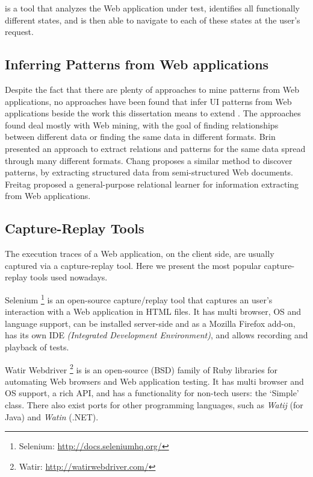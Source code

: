 \cite{dallmeier2012Webmate,dallmeier2013Webmate} is a tool that analyzes the Web application under test, identifies all functionally different states, and is then able to navigate to each of these states at the user’s request.

\subsection{Inferring Patterns from Web applications}
Despite the fact that there are plenty of approaches to mine patterns from Web applications, no approaches have been found that infer UI patterns from Web applications beside the work this dissertation means to extend \cite{nabuco2013inferring, morgado2012gui}. The approaches found deal mostly with Web mining, with the goal of finding relationships between different data or finding the same data in different formats. Brin \cite{brin1999extracting} presented an approach to extract relations and patterns for the same data spread through many different formats. Chang \cite{chang2003automatic} proposes a similar method to discover patterns, by extracting structured data from semi-structured Web documents. Freitag \cite{freitag1998information} proposed a general-purpose relational learner for information extracting from Web applications.

\subsection{Capture-Replay Tools}
The execution traces of a Web application, on the client side, are usually captured via a capture-replay tool. Here we present the most popular capture-replay tools used nowadays.

Selenium \footnote{Selenium: \url{http://docs.seleniumhq.org/}} is an open-source capture/replay tool that captures an user's interaction with a Web application in HTML files. It has multi browser, OS and language support, can be installed server-side and as a Mozilla Firefox add-on, has its own IDE \textit{(Integrated Development Environment)}, and allows recording and playback of tests.

Watir Webdriver \footnote{Watir: \url{http://watirwebdriver.com/}} is is an open-source (BSD) family of Ruby libraries for automating Web browsers and Web application testing. It has multi browser and OS support, a rich API, and has a functionality for non-tech users: the ‘Simple’ class. There also exist ports for other programming languages, such as \textit{Watij} (for Java) and \textit{Watin} (.NET).

